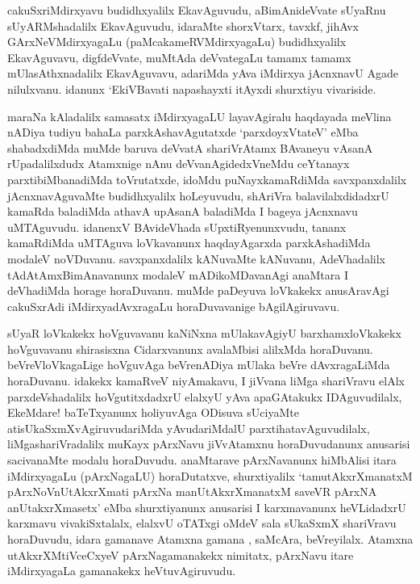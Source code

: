 
\begin{artha}
cakuSxriMdirxyavu budidhxyalilx EkavAguvudu, aBimAnideVvate sUyaRnu sUyARMshadalilx EkavAguvudu, idaraMte shorxVtarx, tavxkf, jihAvx GArxNeVMdirxyagaLu (paMcakameRVMdirxyagaLu) budidhxyalilx EkavAguvavu, digfdeVvate, muMtAda deVvategaLu tamamx tamamx mUlasAthxnadalilx EkavAguvavu, adariMda yAva iMdirxya jAcnxnavU Agade nilulxvanu. idanunx `EkiVBavati napashayxti itAyxdi shurxtiyu vivariside.
\end{artha}


\begin{artha}
maraNa kAladalilx samasatx iMdirxyagaLU layavAgiralu haqdayada meVlina nADiya tudiyu bahaLa parxkAshavAgutatxde `parxdoyxVtateV' eMba shabadxdiMda muMde baruva deVvatA shariVrAtamx BAvaneyu vAsanA rUpadalilxdudx Atamxnige nAnu deVvanAgidedxVneMdu ceYtanayx parxtibiMbanadiMda toVrutatxde, idoMdu puNayxkamaRdiMda savxpanxdalilx jAcnxnavAguvaMte budidhxyalilx hoLeyuvudu, shAriVra balavilalxdidadxrU kamaRda baladiMda athavA upAsanA baladiMda I bageya jAcnxnavu uMTAguvudu. idanenxV BAvideVhada sUpxtiRyenunxvudu, tananx kamaRdiMda uMTAguva loVkavanunx haqdayAgarxda parxkAshadiMda modaleV noVDuvanu. savxpanxdalilx kANuvaMte kANuvanu, AdeVhadalilx tAdAtAmxBimAnavanunx modaleV mADikoMDavanAgi anaMtara I deVhadiMda horage horaDuvanu. muMde paDeyuva loVkakekx anusAravAgi cakuSxrAdi iMdirxyadAvxragaLu horaDuvavanige bAgilAgiruvavu. 
\end{artha}%

\begin{artha}
sUyaR loVkakekx hoVguvavanu kaNiNxna mUlakavAgiyU barxhamxloVkakekx hoVguvavanu shirasisxna Cidarxvanunx avalaMbisi alilxMda horaDuvanu. beVreVloVkagaLige hoVguvAga beVrenADiya mUlaka beVre dAvxragaLiMda horaDuvanu. idakekx kamaRveV niyAmakavu, I jiVvana liMga shariVravu elAlx parxdeVshadalilx hoVgutitxdadxrU elalxyU yAva apaGAtakukx IDAguvudilalx, EkeMdare! baTeTxyanunx holiyuvAga ODisuva sUciyaMte atisUkaSxmXvAgiruvudariMda yAvudariMdalU parxtihatavAguvudilalx, liMgashariVradalilx muKayx pArxNavu jiVvAtamxnu horaDuvudanunx anusarisi sacivanaMte modalu horaDuvudu. anaMtarave pArxNavanunx hiMbAlisi itara iMdirxyagaLu (pArxNagaLU) horaDutatxve, shurxtiyalilx `tamutAkxrXmanatxM pArxNoV\s nUtAkxrXmati pArxNa manUtAkxrXmanatxM saveVR pArxNA anUtakxrXmasetx' eMba shurxtiyanunx anusarisi I karxmavanunx heVLidadxrU karxmavu vivakiSxtalalx, elalxvU oTATxgi oMdeV sala sUkaSxmX shariVravu horaDuvudu, idara gamanave Atamxna gamana , saMcAra, beVreyilalx. Atamxna utAkxrXMtiVceCxyeV pArxNagamanakekx nimitatx, pArxNavu itare iMdirxyagaLa gamanakekx heVtuvAgiruvudu.
\end{artha}

